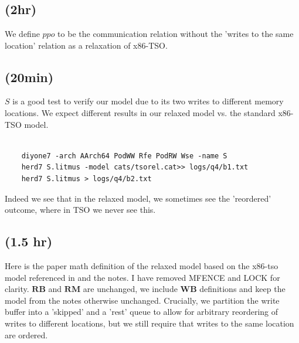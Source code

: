 \section{}
\subsection{(2hr)}

We define $ppo$ to be the communication relation without the 'writes to the same location' relation as a relaxation of x86-TSO. 



\subsection{(20min)}

$S$ is a good test to verify our model due to its two writes to different memory locations. 
We expect different results in our relaxed model vs. the standard x86-TSO model.

\begin{lstlisting}
    
    diyone7 -arch AArch64 PodWW Rfe PodRW Wse -name S
    herd7 S.litmus -model cats/tsorel.cat>> logs/q4/b1.txt
    herd7 S.litmus > logs/q4/b2.txt 

\end{lstlisting}

Indeed we see that in the relaxed model, we sometimes see the 'reordered' outcome, where in TSO we never see this. 




\subsection{(1.5 hr)}
Here is the paper math definition of the relaxed model based on the x86-tso model referenced in \cite{alglave2014herding} and the notes.
I have removed MFENCE and LOCK for clarity. 
$\mathbf{RB}$ and $\mathbf{RM}$ are unchanged, we include $\mathbf{WB}$ definitions and keep the model from the notes otherwise unchanged.
Crucially, we partition the write buffer into a 'skipped' and a 'rest' queue to allow for arbitrary reordering of writes to different locations,
 but we still require that writes to the same location are ordered.

